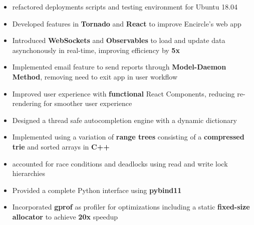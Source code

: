 \documentclass[10pt,a4paper,ragged2e]{altacv}
\begin{document}

\begin{fullwidth}
    \makecvheader
\end{fullwidth}




\begin{itemize}
    \item refactored deployments scripts and testing environment for Ubuntu 18.04
\end{itemize}

\begin{itemize}
    \item Developed features in \textbf{Tornado} and \textbf{React} to improve Encircle's web app
    \item Introduced \textbf{WebSockets} and \textbf{Observables} to load and update data asynchonously in real-time, improving efficiency by \textbf{5x}
    \item Implemented email feature to send reports through \textbf{Model-Daemon Method}, removing need to exit app in user workflow
    \item Improved user experience with \textbf{functional} React Components, reducing re-rendering for smoother user experience 
\end{itemize}


\begin{itemize}
    \item Designed a thread safe autocompletion engine with a dynamic dictionary
    \item Implemented using a variation of \textbf{range trees} consisting of a \textbf{compressed trie} and sorted arrays in \textbf{C++}
    \item accounted for race conditions and deadlocks using read and write lock hierarchies
    \item Provided a complete Python interface using \textbf{pybind11}
    \item Incorporated \textbf{gprof} as profiler for optimizations including a static \textbf{fixed-size allocator} to achieve \textbf{20x} speedup
\end{itemize}
\end{document}

